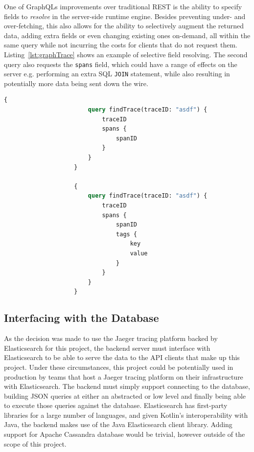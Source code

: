 \documentclass[12pt,pdftex,titlepage]{report}
\begin{document}
                One of GraphQLs improvements over traditional REST is the ability to specify fields to \textit{resolve} in the server-side runtime engine. Besides preventing
                under- and over-fetching, this also allows for the ability to selectively augment the returned data, adding extra fields or even changing existing ones on-demand,
                all within the same query while not incurring the costs for clients that do not request them. Listing~\ref{lst:graphTrace} shows an example of selective field
                resolving. The second query also requests the \texttt{spans} field, which could have a range of effects on the server e.g. performing an extra SQL \texttt{JOIN}
                statement, while also resulting in potentially more data being sent down the wire.

                \bigskip
                \begin{lstlisting}[caption={[Example of two GraphQL queries]GraphQL query to fetch a trace object and the span ID of each of its spans vs a query to fetch the trace object, its spans and every
                    tag of every span.}, label={lst:graphTrace}, language=GraphQL, gobble=20]
                    {
                        query findTrace(traceID: "asdf") {
                            traceID
                            spans {
                                spanID
                            }
                        }
                    }

                    {
                        query findTrace(traceID: "asdf") {
                            traceID
                            spans {
                                spanID
                                tags {
                                    key
                                    value
                                }
                            }
                        }
                    }
                \end{lstlisting}

            \subsection{Interfacing with the Database}
                As the decision was made to use the Jaeger tracing platform backed by Elasticsearch for this project, the backend server must interface with Elasticsearch
                to be able to serve the data to the API clients that make up this project. Under these circumstances, this project could be potentially used in production
                by teams that host a Jaeger tracing platform on their infrastructure with Elasticsearch. The backend must simply support connecting to the database, building 
                JSON queries at either an abstracted or low level and finally being able to execute those queries against the database. Elasticsearch has first-party libraries
                for a  large number of languages, and given Kotlin's interoperability with Java, the backend makes use of the Java Elasticsearch client library. Adding support 
                for Apache Cassandra database would be trivial, however outside of the scope of this project.
\end{document}
